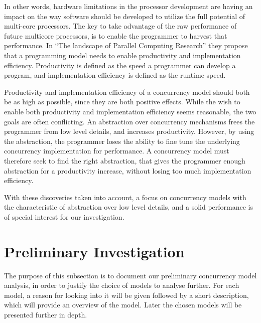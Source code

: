 
In other words, hardware limitations in the processor development are having an impact on the way software should be developed to utilize the full potential of multi-core processors. The key to take advantage of the raw performance of future multicore processors, is to enable the programmer to harvest that performance\cite[p. 31]{asanovic2006landscape}. In ``The landscape of Parallel Computing Research''\cite{asanovic2006landscape} they propose that a programming model needs to enable productivity and implementation efficiency\cite[p. 31]{asanovic2006landscape}. Productivity is defined as the speed a programmer can develop a program, and implementation efficiency is defined as the runtime speed.

Productivity and implementation efficiency of a concurrency model should both be as high as possible, since they are both positive effects. While the wish to enable both productivity and implementation efficiency seems reasonable, the two goals are often conflicting. An abstraction over concurrency mechanisms frees the programmer from low level details, and increases productivity. However, by using the abstraction, the programmer loses the ability to fine tune the underlying concurrency implementation for performance. A concurrency model must therefore seek to find the right abstraction, that gives the programmer enough abstraction for a productivity increase, without losing too much implementation efficiency.

With these discoveries taken into account, a focus on concurrency models with the characteristic of abstraction over low level details, and a solid performance is of special interest for our investigation.

\section{Preliminary Investigation}\label{sec:prelim}
The purpose of this subsection is to document our preliminary concurrency model analysis, in order to justify the choice of models to analyse further. For each model, a reason for looking into it will be given followed by a short description, which will provide an overview of the model. Later the chosen models will be presented further in depth.

